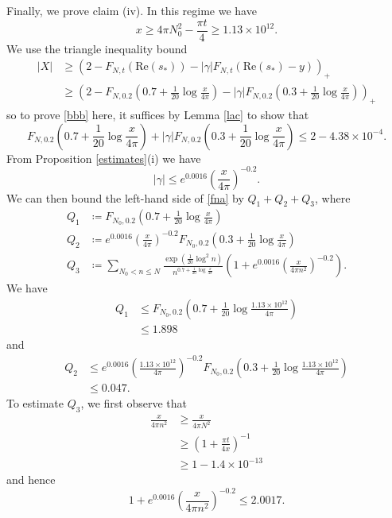 Finally, we prove claim (iv).  In this regime we have
$$ x \geq 4\pi N_0^2 - \frac{\pi t}{4} \geq 1.13 \times 10^{12}.$$
We use the triangle inequality bound
\begin{align*}
|X| &\geq \left( 2 - F_{N,t}(\mathrm{Re}(s_*)) - |\gamma| F_{N,t}(\mathrm{Re}(s_*) - y) \right)_+ \\
&\geq \left( 2 - F_{N,0.2}(0.7 + \frac{1}{20} \log \frac{x}{4\pi}) - |\gamma| F_{N,0.2}(0.3 + \frac{1}{20} \log \frac{x}{4\pi}) \right)_+ 
\end{align*}
so to prove \eqref{bbb} here, it suffices by Lemma \ref{lac} to show that
\begin{equation}\label{fna}
F_{N,0.2}(0.7 + \frac{1}{20} \log \frac{x}{4\pi}) + |\gamma| F_{N,0.2}( 0.3 + \frac{1}{20} \log \frac{x}{4\pi} )  \leq 2 - 4.38 \times 10^{-4}.
\end{equation}
From Proposition \ref{estimates}(i) we have
$$ |\gamma| \leq e^{0.0016} \left( \frac{x}{4\pi} \right)^{-0.2}.$$
We can then bound the left-hand side of \eqref{fna} by $Q_1+Q_2+Q_3$, where
\begin{align*}
Q_1 &\coloneqq F_{N_0,0.2}(0.7 + \frac{1}{20} \log \frac{x}{4\pi}) \\
Q_2 &\coloneqq e^{0.0016} \left( \frac{x}{4\pi} \right)^{-0.2} F_{N_0,0.2}( 0.3 + \frac{1}{20} \log \frac{x}{4\pi} ) \\
Q_3 &\coloneqq \sum_{N_0 < n \leq N} \frac{\exp( \frac{1}{20} \log^2 n)}{n^{0.7 + \frac{1}{20} \log \frac{x}{4\pi}}} (1 + e^{0.0016} (\frac{x}{4\pi n^2})^{-0.2}).
\end{align*}
We have
\begin{align*}
Q_1 &\leq F_{N_0,0.2}(0.7 + \frac{1}{20} \log \frac{1.13 \times 10^{12}}{4\pi}) \\
&\leq 1.898
\end{align*}
and
\begin{align*}
Q_2 &\leq e^{0.0016} \left( \frac{1.13 \times 10^{12}}{4\pi} \right)^{-0.2}  F_{N_0,0.2}(0.3 + \frac{1}{20} \log \frac{1.13 \times 10^{12}}{4\pi}) \\
&\leq 0.047.
\end{align*}
To estimate $Q_3$, we first observe that
\begin{align*}
\frac{x}{4\pi n^2} &\geq \frac{x}{4\pi N^2} \\
&\geq \left(1 + \frac{\pi t}{4x}\right)^{-1} \\
&\geq 1 - 1.4 \times 10^{-13}
\end{align*}
and hence
$$ 1 + e^{0.0016} (\frac{x}{4\pi n^2})^{-0.2} \leq 2.0017.$$
